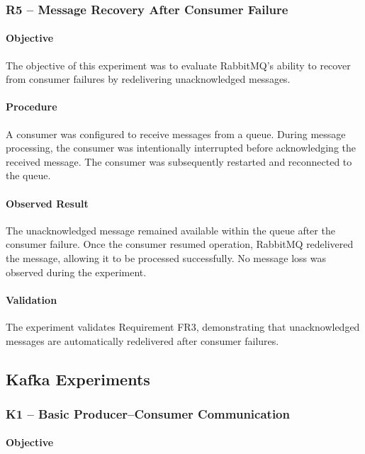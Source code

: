 \documentclass{scrartcl}
\begin{document}
\subsubsection{R5 -- Message Recovery After Consumer Failure}

\paragraph{Objective}
The objective of this experiment was to evaluate RabbitMQ’s ability to recover from consumer failures by redelivering unacknowledged messages.

\paragraph{Procedure}

A consumer was configured to receive messages from a queue. During message processing, the consumer was intentionally interrupted before acknowledging the received message. The consumer was subsequently restarted and reconnected to the queue.

\paragraph{Observed Result}

The unacknowledged message remained available within the queue after the consumer failure. Once the consumer resumed operation, RabbitMQ redelivered the message, allowing it to be processed successfully. No message loss was observed during the experiment.

\paragraph{Validation}

The experiment validates Requirement FR3, demonstrating that unacknowledged messages are automatically redelivered after consumer failures.

\subsection{Kafka Experiments}

\subsubsection{K1 -- Basic Producer--Consumer Communication}

\paragraph{Objective}
\end{document}
